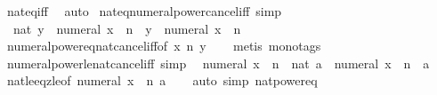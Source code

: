 \begin{isabellebody}
%
\isatagproof
{}\isamarkupfalse%
\ nat{\isacharunderscore}{\kern0pt}eq{\isacharunderscore}{\kern0pt}iff{}\ \isamarkupfalse%
\ auto%
\endisatagproof
{\isafoldproof}%
%
\isadelimproof
\isanewline
%
\endisadelimproof
\isanewline
{}\isamarkupfalse%
\ nat{\isacharunderscore}{\kern0pt}eq{\isacharunderscore}{\kern0pt}numeral{\isacharunderscore}{\kern0pt}power{\isacharunderscore}{\kern0pt}cancel{\isacharunderscore}{\kern0pt}iff\ {\isacharbrackleft}{\kern0pt}simp{\isacharbrackright}{\kern0pt}{\isacharcolon}{\kern0pt}\isanewline
\ \ {\isachardoublequoteopen}nat\ y\ {\isacharequal}{\kern0pt}\ numeral\ x\ {\isacharcircum}{\kern0pt}\ n\ {\isasymlongleftrightarrow}\ y\ {\isacharequal}{\kern0pt}\ numeral\ x\ {\isacharcircum}{\kern0pt}\ n{\isachardoublequoteclose}\isanewline
%
\isadelimproof
\ \ %
\endisadelimproof
%
\isatagproof
{}\isamarkupfalse%
\ numeral{\isacharunderscore}{\kern0pt}power{\isacharunderscore}{\kern0pt}eq{\isacharunderscore}{\kern0pt}nat{\isacharunderscore}{\kern0pt}cancel{\isacharunderscore}{\kern0pt}iff{\isacharbrackleft}{\kern0pt}of\ x\ n\ y{\isacharbrackright}{\kern0pt}\isanewline
\ \ \isamarkupfalse%
\ {\isacharparenleft}{\kern0pt}metis\ {\isacharparenleft}{\kern0pt}mono{\isacharunderscore}{\kern0pt}tags{\isacharparenright}{\kern0pt}{\isacharparenright}{\kern0pt}%
\endisatagproof
{\isafoldproof}%
%
\isadelimproof
\isanewline
%
\endisadelimproof
\isanewline
{}\isamarkupfalse%
\ numeral{\isacharunderscore}{\kern0pt}power{\isacharunderscore}{\kern0pt}le{\isacharunderscore}{\kern0pt}nat{\isacharunderscore}{\kern0pt}cancel{\isacharunderscore}{\kern0pt}iff\ {\isacharbrackleft}{\kern0pt}simp{\isacharbrackright}{\kern0pt}{\isacharcolon}{\kern0pt}\isanewline
\ \ {\isachardoublequoteopen}numeral\ x\ {\isacharcircum}{\kern0pt}\ n\ {\isasymle}\ nat\ a\ {\isasymlongleftrightarrow}\ numeral\ x\ {\isacharcircum}{\kern0pt}\ n\ {\isasymle}\ a{\isachardoublequoteclose}\isanewline
%
\isadelimproof
\ \ %
\endisadelimproof
%
\isatagproof
{}\isamarkupfalse%
\ nat{\isacharunderscore}{\kern0pt}le{\isacharunderscore}{\kern0pt}eq{\isacharunderscore}{\kern0pt}zle{\isacharbrackleft}{\kern0pt}of\ {\isachardoublequoteopen}numeral\ x\ {\isacharcircum}{\kern0pt}\ n{\isachardoublequoteclose}\ a{\isacharbrackright}{\kern0pt}\isanewline
\ \ \isamarkupfalse%
\ {\isacharparenleft}{\kern0pt}auto\ simp{\isacharcolon}{\kern0pt}\ nat{\isacharunderscore}{\kern0pt}power{\isacharunderscore}{\kern0pt}eq{\isacharparenright}{\kern0pt}%
\endisatagproof
{\isafoldproof}%

\end{isabellebody}
